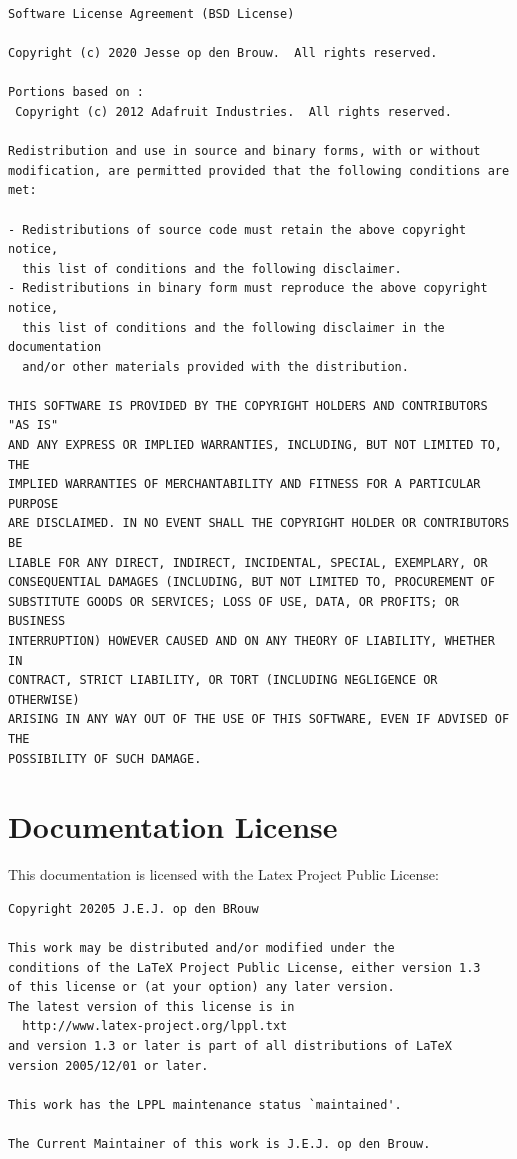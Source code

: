 \documentclass[12pt]{article}
\begin{document}
\begin{lstlisting}[basicstyle=\footnotesize\ttfamily]
Software License Agreement (BSD License)

Copyright (c) 2020 Jesse op den Brouw.  All rights reserved.

Portions based on :
 Copyright (c) 2012 Adafruit Industries.  All rights reserved.

Redistribution and use in source and binary forms, with or without
modification, are permitted provided that the following conditions are met:

- Redistributions of source code must retain the above copyright notice,
  this list of conditions and the following disclaimer.
- Redistributions in binary form must reproduce the above copyright notice,
  this list of conditions and the following disclaimer in the documentation
  and/or other materials provided with the distribution.

THIS SOFTWARE IS PROVIDED BY THE COPYRIGHT HOLDERS AND CONTRIBUTORS "AS IS"
AND ANY EXPRESS OR IMPLIED WARRANTIES, INCLUDING, BUT NOT LIMITED TO, THE
IMPLIED WARRANTIES OF MERCHANTABILITY AND FITNESS FOR A PARTICULAR PURPOSE
ARE DISCLAIMED. IN NO EVENT SHALL THE COPYRIGHT HOLDER OR CONTRIBUTORS BE
LIABLE FOR ANY DIRECT, INDIRECT, INCIDENTAL, SPECIAL, EXEMPLARY, OR
CONSEQUENTIAL DAMAGES (INCLUDING, BUT NOT LIMITED TO, PROCUREMENT OF
SUBSTITUTE GOODS OR SERVICES; LOSS OF USE, DATA, OR PROFITS; OR BUSINESS
INTERRUPTION) HOWEVER CAUSED AND ON ANY THEORY OF LIABILITY, WHETHER IN
CONTRACT, STRICT LIABILITY, OR TORT (INCLUDING NEGLIGENCE OR OTHERWISE)
ARISING IN ANY WAY OUT OF THE USE OF THIS SOFTWARE, EVEN IF ADVISED OF THE
POSSIBILITY OF SUCH DAMAGE.
\end{lstlisting}


\section{Documentation License}
This documentation is licensed with the Latex Project Public License:

\begin{lstlisting}[basicstyle=\footnotesize\ttfamily,showspaces=false,showstringspaces=false]
Copyright 20205 J.E.J. op den BRouw

This work may be distributed and/or modified under the
conditions of the LaTeX Project Public License, either version 1.3
of this license or (at your option) any later version.
The latest version of this license is in
  http://www.latex-project.org/lppl.txt
and version 1.3 or later is part of all distributions of LaTeX
version 2005/12/01 or later.

This work has the LPPL maintenance status `maintained'.
 
The Current Maintainer of this work is J.E.J. op den Brouw.
\end{lstlisting}
\end{document}
